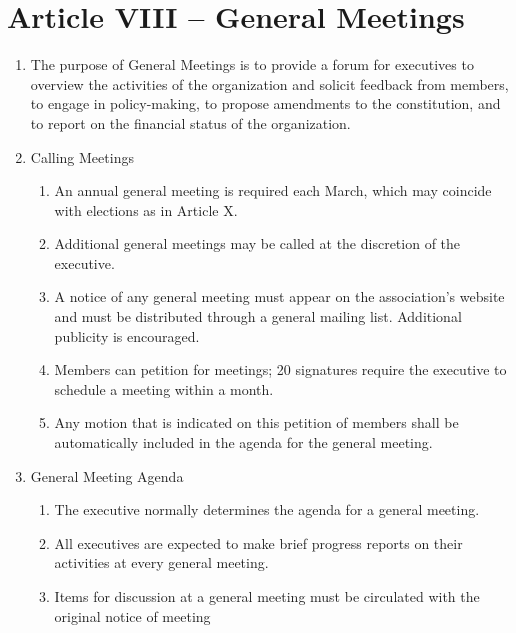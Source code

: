 \documentclass[12pt,a4paper]{article}
\begin{document}
\section*{Article VIII – General Meetings}

\begin{enumerate}
\item The purpose of General Meetings is to provide a forum for executives to overview the activities of the organization and solicit feedback from members, to engage in policy-making, to propose amendments to the constitution, and to report on the financial status of the organization.

\item Calling Meetings

\begin{enumerate}
\item An annual general meeting is required each March, which may coincide with elections as in Article X.

\item Additional general meetings may be called at the discretion of the executive.

\item A notice of any general meeting must appear on the association's website and must be distributed through a general mailing list. Additional publicity is encouraged.

\item Members can petition for meetings; 20 signatures require the executive to schedule a meeting within a month. 

\item Any motion that is indicated on this petition of members shall be automatically included in the agenda for the general meeting.
\end{enumerate}

\item General Meeting Agenda

\begin{enumerate}
\item The executive normally determines the agenda for a general meeting.

\item All executives are expected to make brief progress reports on their activities at every general meeting.

\item Items for discussion at a general meeting must be circulated with the original notice of meeting


\end{enumerate}
\end{enumerate}
\end{document}
